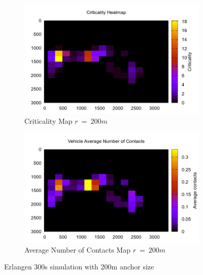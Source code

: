 \begin{figure}[t]
	\begin{subfigure}[t]{0.5\textwidth}
 		\includegraphics[width=\textwidth]{img/Erlangen/criticality3_sim_Erlangen_300s_200m}
 		\caption{Criticality Map $r\ =\ 200m$}
 		\label{fig:Erlangen_criticality_300s_200m}
 	\end{subfigure}%
 	\hfill
 	\begin{subfigure}[t]{0.5\textwidth}
 		\includegraphics[width=\textwidth]{img/Erlangen/avgContacts_sim_Erlangen_300s_200m}
 		\caption{Average Number of Contacts Map $r\ =\ 200m$}
 		\label{fig:Erlangen_avg_300s_200m}
 	\end{subfigure}
 	\caption{Erlangen 300s simulation with 200m anchor size}
 	\label{fig:Erlangen_300s_200m}
\end{figure}

